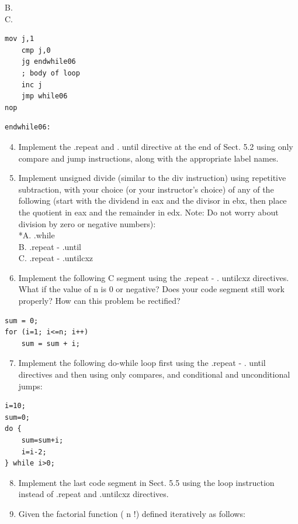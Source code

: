 \documentclass[10pt]{book}
\begin{document}
B.\\
C.

\begin{verbatim}
mov j,1
    cmp j,0
    jg endwhile06
    ; body of loop
    inc j
    jmp while06
nop
\end{verbatim}

\begin{verbatim}
endwhile06:
\end{verbatim}

\begin{enumerate}
  \setcounter{enumi}{3}
  \item Implement the .repeat and . until directive at the end of Sect. 5.2 using only compare and jump instructions, along with the appropriate label names.
  \item Implement unsigned divide (similar to the div instruction) using repetitive subtraction, with your choice (or your instructor's choice) of any of the following (start with the dividend in eax and the divisor in ebx, then place the quotient in eax and the remainder in edx. Note: Do not worry about division by zero or negative numbers):\\
*A. .while\\
B. .repeat - .until\\
C. .repeat - .untilcxz
  \item Implement the following C segment using the .repeat - . untilcxz directives. What if the value of n is 0 or negative? Does your code segment still work properly? How can this problem be rectified?
\end{enumerate}

\begin{verbatim}
sum = 0;
for (i=1; i<=n; i++)
    sum = sum + i;
\end{verbatim}

\begin{enumerate}
  \setcounter{enumi}{6}
  \item Implement the following do-while loop first using the .repeat - . until directives and then using only compares, and conditional and unconditional jumps:
\end{enumerate}

\begin{verbatim}
i=10;
sum=0;
do {
    sum=sum+i;
    i=i-2;
} while i>0;
\end{verbatim}

\begin{enumerate}
  \setcounter{enumi}{7}
  \item Implement the last code segment in Sect. 5.5 using the loop instruction instead of .repeat and .untilcxz directives.
  \item Given the factorial function ( n !) defined iteratively as follows:
\end{enumerate}
\end{document}
